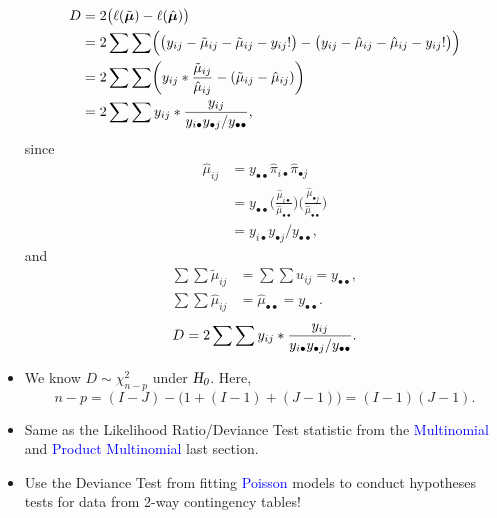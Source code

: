 \documentclass[oneside]{book}\usepackage[]{graphicx}\usepackage[svgnames]{xcolor}
\let\log\relax%
\newcommand{\HN}{\textsl{H}_{\textsl{0}}}%
\providecommand{\Vector}[1]{\bm{#1}}%
\begin{document}
\begin{itemize}
          \begin{align*}
              D
               & =2\bigl(\ell(\tilde{\Vector{\mu}})-\ell(\hat{\Vector{\mu}})\bigr)                                                                                                   \\
               & =2\sum\sum\Bigl(\bigl(y_{ij}-\log{\tilde{\mu}_{ij}}-\tilde{\mu}_{ij}-\log{y_{ij}!}\bigr)-\bigl(y_{ij}-\log{\hat{\mu}_{ij}}-\hat{\mu}_{ij}-\log{y_{ij}!}\bigr)\Bigr) \\
               & =2\sum\sum\biggl(y_{ij}\log*{\frac{\tilde{\mu}_{ij}}{\hat{\mu}_{ij}}}-(\tilde{\mu}_{ij}-\hat{\mu}_{ij})\biggr)                                                      \\
               & =2\sum\sum y_{ij}\log*{\frac{y_{ij}}{y_{i\bullet}y_{\bullet j}/y_{\bullet\bullet}}},
          \end{align*}
          since
          \begin{align*}
              \hat{\mu}_{ij}
               & =y_{\bullet\bullet}\hat{\pi}_{i\bullet}\hat{\pi}_{\bullet j}                                                                                                   \\
               & =y_{\bullet\bullet}\biggl(\frac{\hat{\mu}_{i\bullet}}{\hat{\mu}_{\bullet\bullet}}\biggr)\biggl(\frac{\hat{\mu}_{\bullet j}}{\hat{\mu}_{\bullet\bullet}}\biggr) \\
               & =y_{i\bullet}y_{\bullet j}/y_{\bullet\bullet},
          \end{align*}
          and
          \begin{align*}
              \sum\sum\tilde{\mu}_{ij} & =\sum\sum u_{ij}=y_{\bullet\bullet},            \\
              \sum\sum\hat{\mu}_{ij}   & =\hat{\mu}_{\bullet\bullet}=y_{\bullet\bullet}.
          \end{align*}
          \[ D=2\sum\sum y_{ij}\log*{\frac{y_{ij}}{y_{i\bullet}y_{\bullet j}/y_{\bullet\bullet}}}. \]
    \item We know $ D \sim \chi^2_{n-p} $ under $ \HN $. Here,
          \[ n-p=(I-J)-\bigl(1+(I-1)+(J-1)\bigr)=(I-1)(J-1). \]
    \item Same as the Likelihood Ratio/Deviance Test statistic from the \textcolor{Blue}{Multinomial} and
          \textcolor{Blue}{Product Multinomial} last section.
    \item Use the Deviance Test from fitting \textcolor{Blue}{Poisson} models to conduct hypotheses tests
          for data from 2-way contingency tables!
\end{itemize}
\end{document}
